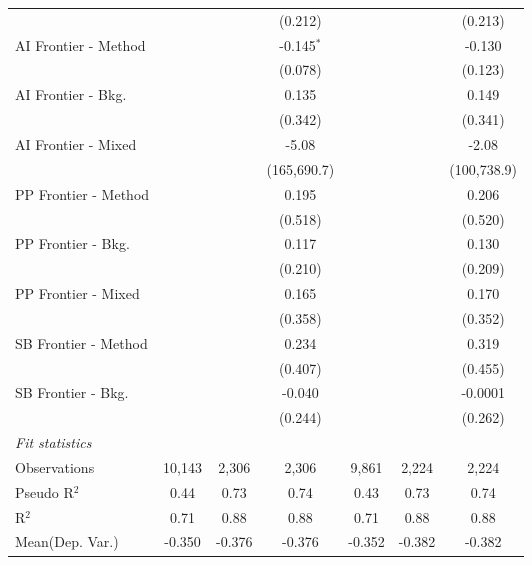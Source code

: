 \begin{tabular}{lcccccc}
                        &                &         & (0.212)      &                &         & (0.213)\\   
   AI Frontier - Method &                &         & -0.145$^{*}$ &                &         & -0.130\\   
                        &                &         & (0.078)      &                &         & (0.123)\\   
   AI Frontier - Bkg.   &                &         & 0.135        &                &         & 0.149\\   
                        &                &         & (0.342)      &                &         & (0.341)\\   
   AI Frontier - Mixed  &                &         & -5.08        &                &         & -2.08\\   
                        &                &         & (165,690.7)  &                &         & (100,738.9)\\   
   PP Frontier - Method &                &         & 0.195        &                &         & 0.206\\   
                        &                &         & (0.518)      &                &         & (0.520)\\   
   PP Frontier - Bkg.   &                &         & 0.117        &                &         & 0.130\\   
                        &                &         & (0.210)      &                &         & (0.209)\\   
   PP Frontier - Mixed  &                &         & 0.165        &                &         & 0.170\\   
                        &                &         & (0.358)      &                &         & (0.352)\\   
   SB Frontier - Method &                &         & 0.234        &                &         & 0.319\\   
                        &                &         & (0.407)      &                &         & (0.455)\\   
   SB Frontier - Bkg.   &                &         & -0.040       &                &         & -0.0001\\   
                        &                &         & (0.244)      &                &         & (0.262)\\   
   \midrule
   \emph{Fit statistics}\\
   Observations         & 10,143         & 2,306   & 2,306        & 9,861          & 2,224   & 2,224\\  
   Pseudo R$^2$         & 0.44           & 0.73    & 0.74         & 0.43           & 0.73    & 0.74\\  
   R$^2$                & 0.71           & 0.88    & 0.88         & 0.71           & 0.88    & 0.88\\  
Mean(Dep. Var.) & -0.350 & -0.376 & -0.376 & -0.352 & -0.382 & -0.382 \\
   

\end{tabular}
